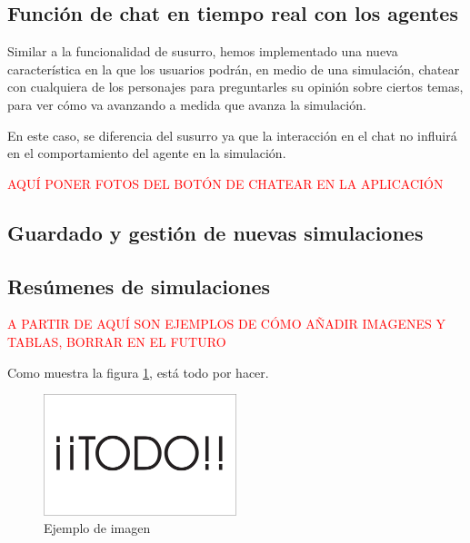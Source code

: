 \subsection{Función de chat en tiempo real con los agentes}
Similar a la funcionalidad de susurro, hemos implementado una nueva característica en la que los usuarios podrán, en medio de una simulación, chatear con cualquiera de los personajes para preguntarles su opinión sobre ciertos temas, para ver cómo va avanzando a medida que avanza la simulación.

En este caso, se diferencia del susurro ya que la interacción en el chat no influirá en el comportamiento del agente en la simulación.

\textcolor{red}{AQUÍ PONER FOTOS DEL BOTÓN DE CHATEAR EN LA APLICACIÓN}

\subsection{Guardado y gestión de nuevas simulaciones}

\subsection{Resúmenes de simulaciones}




























\textcolor{red}{A PARTIR DE AQUÍ SON EJEMPLOS DE CÓMO AÑADIR IMAGENES Y TABLAS, BORRAR EN EL FUTURO}


Como muestra la figura \ref{fig:sampleImage}, está todo por hacer.

\begin{figure}[h]
	\centering
	\includegraphics[width = 0.5\textwidth]{Imagenes/Vectorial/Todo.pdf}
	\caption{Ejemplo de imagen}
	\label{fig:sampleImage}
\end{figure}

